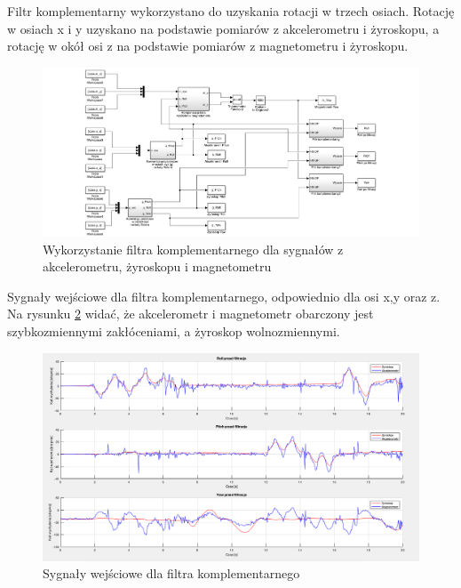 Filtr komplementarny wykorzystano do uzyskania rotacji w trzech osiach. Rotację w osiach x i y uzyskano na podstawie pomiarów z akcelerometru i żyroskopu, a rotację w okół osi z na podstawie pomiarów z magnetometru i żyroskopu.
\begin{figure}[h!]
    \centering
    \includegraphics[width=1\textwidth]{Rysunki/Rozdzial04/Filtr_komplementarny_struktura_png.png}
    \caption{Wykorzystanie filtra komplementarnego dla sygnałów z akcelerometru, żyroskopu i magnetometru}
    \label{Komplementarny struktura}
\end{figure}

Sygnały wejściowe dla filtra komplementarnego, odpowiednio dla osi x,y oraz z. Na rysunku \ref{Komplementarny przed} widać, że akcelerometr i magnetometr obarczony jest szybkozmiennymi zakłóceniami, a żyroskop wolnozmiennymi.
\begin{figure}[h!]
    \centering
    \includegraphics[width=1\textwidth]{Rysunki/Rozdzial04/Filtr_komplementarny_przed.png}
    \caption{Sygnały wejściowe dla filtra komplementarnego}
    \label{Komplementarny przed}
\end{figure}

